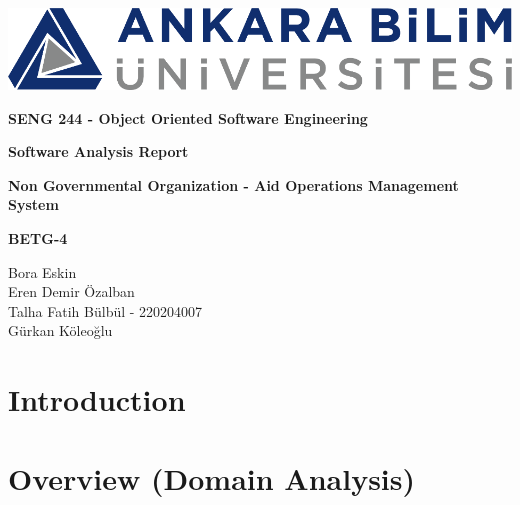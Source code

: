 \documentclass[a4paper,12pt]{report}
\begin{document}
	\begin{titlepage}
		\begin{center}
			\includegraphics{ankara_bilim.png}
		\end{center}
		\vspace{1cm}
		\begin{center}
			\LARGE
			\textbf{SENG 244 - Object Oriented Software Engineering}
		\end{center}
		\vspace{1cm}
		\begin{center}
			\Large
			\textbf{Software Analysis Report}
		\end{center}
		\vspace{1cm}
		\begin{center}
			\Large
			\textbf{Non Governmental Organization - Aid Operations Management System}
		\end{center}
		\vspace{2cm}
		\begin{center}
			\large
			\textbf{BETG-4}
		\end{center}
		\vspace{1cm}
		\begin{center}
			\large
			Bora Eskin\\
			Eren Demir Özalban\\
			Talha Fatih Bülbül - 220204007\\
			Gürkan Köleoğlu
		\end{center}
	\end{titlepage}
	\tableofcontents
	\chapter{Introduction}
	\chapter{Overview (Domain Analysis)}
\end{document}
